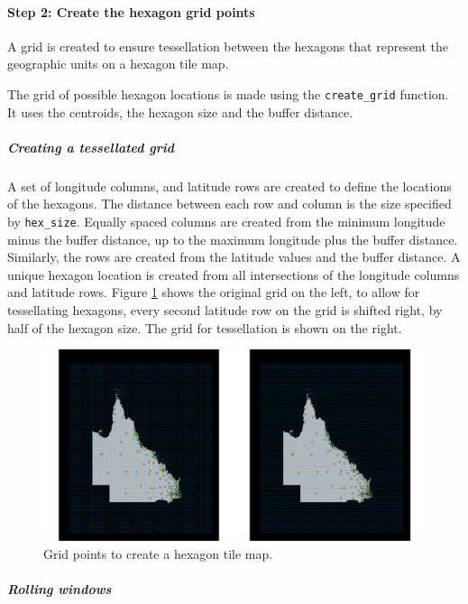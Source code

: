 \hypertarget{step-2-create-the-hexagon-grid-points}{%
\paragraph{Step 2: Create the hexagon grid
points}\label{step-2-create-the-hexagon-grid-points}}

A grid is created to ensure tessellation between the hexagons that
represent the geographic units on a hexagon tile map.

The grid of possible hexagon locations is made using the
\texttt{create\_grid} function. It uses the centroids, the hexagon size
and the buffer distance.

\hypertarget{creating-a-tessellated-grid}{%
\subparagraph{Creating a tessellated
grid}\label{creating-a-tessellated-grid}}

A set of longitude columns, and latitude rows are created to define the
locations of the hexagons. The distance between each row and column is
the size specified by \texttt{hex\_size}. Equally spaced columns are
created from the minimum longitude minus the buffer distance, up to the
maximum longitude plus the buffer distance. Similarly, the rows are
created from the latitude values and the buffer distance. A unique
hexagon location is created from all intersections of the longitude
columns and latitude rows. Figure \ref{fig:grid2} shows the original
grid on the left, to allow for tessellating hexagons, every second
latitude row on the grid is shifted right, by half of the hexagon size.
The grid for tessellation is shown on the right.

\begin{figure}[h]
\centering
\includegraphics[width=16cm]{figs/2grid.png}
\caption{\label{fig:grid2}Grid points to create a hexagon tile map.}
\end{figure}

\hypertarget{rolling-windows}{%
\subparagraph{Rolling windows}\label{rolling-windows}}

